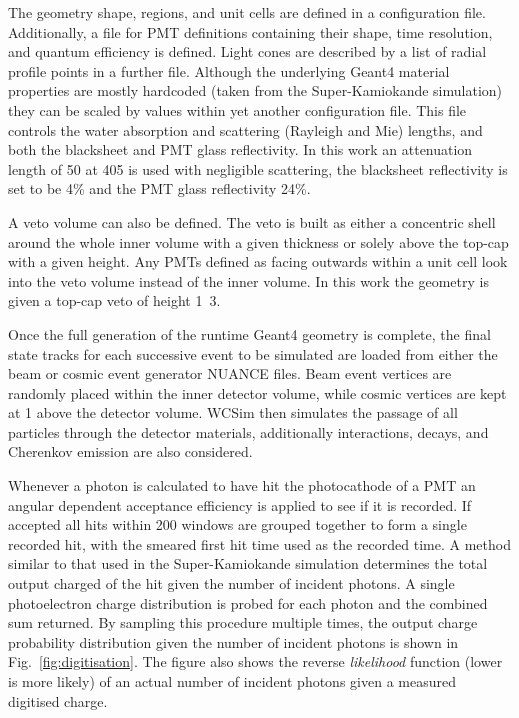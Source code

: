 The geometry shape, regions, and unit cells are defined in a configuration file. Additionally, a
file for PMT definitions containing their shape, time resolution, and quantum efficiency is
defined. Light cones are described by a list of radial profile points in a further file. Although
the underlying Geant4 material properties are mostly hardcoded (taken from the Super-Kamiokande
simulation) they can be scaled by values within yet another configuration file. This file controls
the water absorption and scattering (Rayleigh and Mie) lengths, and both the blacksheet and PMT
glass reflectivity. In this work an attenuation length of \unit{50}{} at
\unit{405}{} is used with negligible scattering, the blacksheet reflectivity is set to
be 4\% and the PMT glass reflectivity 24\%.

A veto volume can also be defined. The veto is built as either a concentric shell around the whole
inner volume with a given thickness or solely above the top-cap with a given height. Any PMTs
defined as facing outwards within a unit cell look into the veto volume instead of the inner
volume. In this work the \chipsfive geometry is given a top-cap veto of height
\unit{1.3}{}.

Once the full generation of the runtime Geant4 geometry is complete, the final state tracks for
each successive event to be simulated are loaded from either the beam or cosmic event generator
NUANCE files. Beam event vertices are randomly placed within the inner detector volume, while
cosmic vertices are kept at \unit{1}{} above the detector volume. WCSim then simulates
the passage of all particles through the detector materials, additionally interactions, decays,
and Cherenkov emission are also considered.

Whenever a photon is calculated to have hit the photocathode of a PMT an angular dependent
acceptance efficiency is applied to see if it is recorded. If accepted all hits within
\unit{200}{} windows are grouped together to form a single recorded hit, with the
smeared first hit time used as the recorded time. A method similar to that used in the
Super-Kamiokande simulation determines the total output charged of the hit given the number of
incident photons. A single photoelectron charge distribution is probed for each photon and the
combined sum returned. By sampling this procedure multiple times, the output charge probability
distribution given the number of incident photons is shown in Fig.~\ref{fig:digitisation}. The
figure also shows the reverse \emph{likelihood} function (lower is more likely) of an actual
number of incident photons given a measured digitised charge.


